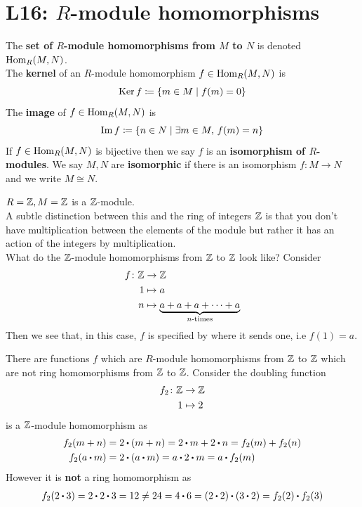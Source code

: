 \documentclass[../Main.tex]{subfiles}
\begin{document}
\chapter{L16: \texorpdfstring{$R$}{R}-module homomorphisms}
\begin{dfn}[title = {\texorpdfstring{$\Hom_R(M,N)$}{Hom}, Kernel, Image, Isomorphism}]
The \textbf{set of $R$-module homomorphisms from $M$ to $N$} is denoted $\Hom_R(M,N)$.\\
The \textbf{kernel} of an $R$-module homomorphism $f\in \operatorname{Hom}_R(M,N)$ is 
\[\operatorname{Ker} f \coloneqq \{m\in M \mid f(m)=0\}\]
The \textbf{image} of $f\in \operatorname{Hom}_R(M,N)$ is
\[\operatorname{Im} f \coloneqq \{n\in N\mid \exists m\in M, \, f(m)=n\}\]
If $f\in\operatorname{Hom}_R(M,N)$ is bijective then we say $f$ is an \textbf{isomorphism of $R$-modules}. We say $M,N$ are \textbf{isomorphic} if there is an isomorphism $f\colon M\to N$ and we write $M\cong N$.
\end{dfn}
\begin{example}
	$R=\mathbb{Z},M=\mathbb{Z}$ is a $\mathbb{Z}$-module. \\
	\Note A subtle distinction between this and the ring of integers $\mathbb{Z}$ is that you don't have multiplication between the elements of the module but rather it has an action of the integers by multiplication.\\
	What do the $\mathbb{Z}$-module homomorphisms from $\mathbb{Z}$ to $\mathbb{Z}$ look like? Consider
	\begin{align*}
	f\colon \mathbb{Z} &\to \mathbb{Z} \\
	1&\mapsto a \\
	n&\mapsto \underbrace{a+a+a+\dots+a}_{n\text{-times}}
	\end{align*}
	Then we see that, in this case, $f$ is specified by where it sends one, i.e $f(1)=a$.
\end{example}
\Note There are functions $f$ which are $R$-module homomorphisms from $\mathbb{Z} $ to $\mathbb{Z}$ which are not ring homomorphisms from $\mathbb{Z}$ to $\mathbb{Z}$. Consider the doubling function
\begin{align*}
f_2\colon \mathbb{Z}&\to \mathbb{Z} \\
1&\mapsto 2
\end{align*}
is a $\mathbb{Z}$-module homomorphism as
\begin{align*}
f_2(m+n)&=2\rdot (m+n)=2\rdot m+2\rdot n = f_2(m)+f_2(n)\\
f_2(a\rdot m)&=2\rdot (a\rdot m) = a\rdot 2\rdot m = a\rdot f_2(m)
\end{align*}
However it is \textbf{not} a ring homomorphism as
\begin{align*}
f_2(2\rdot 3) = 2\rdot 2\rdot 3 =12 \ne 24 = 4\rdot 6 = (2\rdot 2) \rdot  (3\rdot 2) = f_2(2)\rdot f_2(3)
\end{align*}
\end{document}
